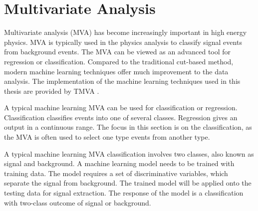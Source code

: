 \section{Multivariate Analysis}
\label{sec:pandoraMVA}

Multivariate analysis (MVA) has become increasingly important in high energy physics. MVA is typically used in the physics analysis to classify signal events from background events. The MVA can be viewed as an advanced tool for regression or classification. Compared to the traditional cut-based method, modern machine learning techniques offer much improvement to the data analysis. The implementation of the machine learning techniques used in this thesis are provided by  TMVA \cite{Hocker:2007ht}.

A typical machine learning MVA can be used for classification or regression. Classification classifies events into one of several classes. Regression gives an output in a continuous range. The focus in this section is on the classification, as the MVA is often used to select one type events from another type.

A typical machine learning MVA classification involves two classes, also known as signal and background. A machine learning model needs to be trained with training data. The model requires a set of discriminative variables, which separate the signal from background. The trained model will be applied onto the testing data for signal extraction. The response of the model is a classification with two-class outcome of  signal or background.

